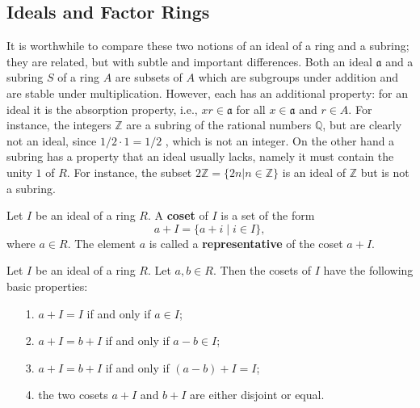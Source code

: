 \documentclass[graybox, reqno]{svmono}
\newcommand{\zz}{\mathbb Z}
\newcommand{\qq}{\mathbb Q}
\newcommand{\ideala}{\mathfrak{a}}
\begin{document}
\subsection*{Ideals and Factor Rings}
It is worthwhile to compare these two notions of an ideal of a ring and a subring;
they are related, but with subtle and important differences. Both an ideal $\ideala$ and
a subring $S$ of a ring $A$ are subsets of $A$ which are subgroups under addition and
are stable under multiplication. However, each has an additional property: for an
ideal it is the absorption property, i.e., $xr \in \ideala$ for all $x \in \ideala$ and $r \in A$. For instance, the integers $\zz$ are a subring
of the rational numbers $\qq$, but are clearly not an ideal, since $1/2 · 1 = 1/2$ , which is not an integer. On the other hand a subring has a property that an ideal usually lacks, namely it must contain the unity $1$ of $R$. For instance, the subset $2\zz = \{ 2n | n \in \zz \}$ is an ideal of $\zz$ but is not a subring. 
\begin{definition} Let $I$ be an ideal of a ring $R$. A \textup{\textbf{coset}} of $I$ is a set of the form \[a + I = \{ a + i \mid i \in I \}, \] where $a \in R$. The element $a$ is called a \textup{\textbf{representative}} of the coset $a+I$. 
\end{definition} 
\begin{theorem} Let $I$ be an ideal of a ring $R$. Let $a, b \in R$. Then the cosets of $I$ have the following basic properties: 
\begin{itemize}
\item[1. ] $a+ I = I$ if and only if $a \in I$;
\item[2. ] $a+ I= b +I$ if and only if $a-b \in I$;
\item[3. ] $a+ I = b+ I$ if and only if $(a-b)+ I = I$;
\item[4. ] the two cosets $a+I$ and $b+I$ are either disjoint or equal.
\end{itemize}
\end{theorem}
\end{document}
